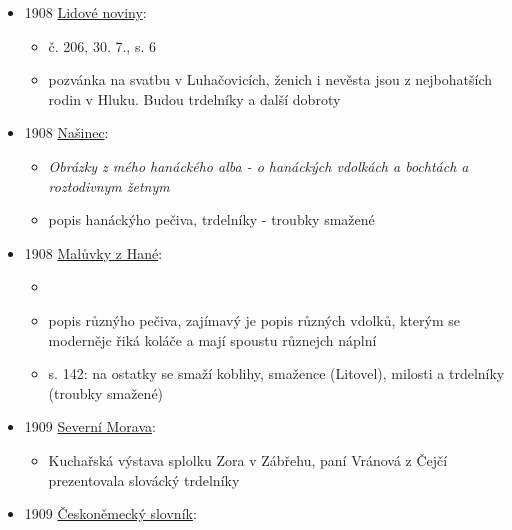 \begin{itemize}
  \begin{itemize}
  \tightlist
  \item
    roč. 3, č. 43, s. 5
  \item
    pozvánka na svatbu v Luhačovicích
  \item
    bude tam spousta vdolků, vdolečků, makovníků, skládanek, koblihů,
    milostí a trdelníků a dalšího jídla
  \end{itemize}
\item
  1908
  \href{https://www.digitalniknihovna.cz/vkol/uuid/uuid:c11919dc-435d-11dd-b505-00145e5790ea}{Lidové
  noviny}:

  \begin{itemize}
  \tightlist
  \item
    č. 206, 30. 7., s. 6
  \item
    pozvánka na svatbu v Luhačovicích, ženich i nevěsta jsou z
    nejbohatších rodin v Hluku. Budou trdelníky a další dobroty
  \end{itemize}
\item
  1908
  \href{https://ceskadigitalniknihovna.cz/uuid/uuid:d373d613-8285-11e0-b92b-0050569d679d}{Našinec}:

  \begin{itemize}
  \tightlist
  \item
     \emph{Obrázky z mého hanáckého alba - o
    hanáckých vdolkách a bochtách a roztodivnym žetnym}
  \item
    popis hanáckýho pečiva, trdelníky - troubky smažené
  \end{itemize}
\item
  1908
  \href{https://www.digitalniknihovna.cz/vkol/uuid/uuid:22fabc33-2702-4555-bae2-70a542320fa7}{Malůvky
  z Hané}:

  \begin{itemize}
  \tightlist
  \item
  \item
    popis různýho pečiva, zajímavý je popis různých vdolků, kterým se
    modernějc řiká koláče a mají spoustu různejch náplní
  \item
    s. 142: na ostatky se smaží koblihy, smažence (Litovel), milosti a
    trdelníky (troubky smažené)
  \end{itemize}
\item
  1909
  \href{https://www.digitalniknihovna.cz/vkol/uuid/uuid:8de01b83-a076-483b-b755-bd2e9de6e830}{Severní
  Morava}:

  \begin{itemize}
  \tightlist
  \item
    Kuchařská výstava splolku Zora v Zábřehu, paní Vránová z Čejčí
    prezentovala slovácký trdelníky
  \end{itemize}
\item
  1909
  \href{https://ceskadigitalniknihovna.cz/uuid/uuid:a6ed5320-aa9f-11e3-bb86-005056825209}{Českoněmecký
  slovník}:


\end{itemize}
